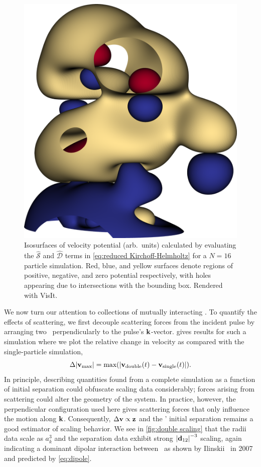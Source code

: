 \begin{figure}
  \centering
  \ifmakeplots
    \includegraphics[width=0.5\columnwidth]{figures/3d_isosurface.png}
  \fi
  \caption{
    \label{fig:isosurface}
    Isosurfaces of velocity potential (arb.~units) calculated by evaluating the $\hat{\mathcal{S}}$ and $\hat{\mathcal{D}}$ terms in \cref{eq:reduced Kirchoff-Helmholtz} for a $N = 16$ particle simulation.
    Red, blue, and yellow surfaces denote regions of positive, negative, and zero potential respectively, with holes appearing due to intersections with the bounding box.
    Rendered with VisIt\cite{VisIt}.
  }
\end{figure}
We now turn our attention to collections of mutually interacting \bubbles.
To quantify the effects of scattering, we first decouple scattering forces from the incident pulse by arranging two \bubbles\ perpendicularly to the pulse's $\vb{k}$-vector.
 gives results for such a simulation where we plot the relative change in velocity as compared with the single-particle simulation,
\begin{equation}
  \Delta \abs{\vb{v}_\text{max}} = \text{max}\qty(\abs{\vb{v}_\text{double}(t) - \vb{v}_\text{single}(t)}).
\end{equation}
In principle, describing quantities found from a complete simulation as a function of initial separation could obfuscate scaling data considerably; forces arising from scattering could alter the geometry of the system.
In practice, however, the perpendicular configuration used here gives scattering forces that only influence the motion along $\vb{k}$.
Consequently, $\Delta\vb{v} \propto \vb{z}$ and the \bubbles' initial separation remains a good estimator of scaling behavior.
We see in \cref{fig:double scaling} that the radii data scale as $a_k^3$ and the
separation data exhibit strong $\abs{\vb{d}_{12}}^{-3}$ scaling, again
indicating a dominant dipolar interaction between \bubbles\ as shown by Ilinskii \etal\ in 2007~\cite{Ilinskii2007} and predicted by \cref{eq:dipole}.

